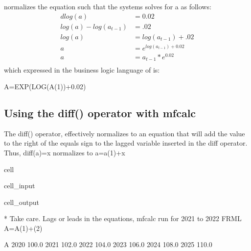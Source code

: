 \documentclass[letterpaper,10pt,english]{jupyterBook}
\begin{document}
\sphinxAtStartPar
{} normalizes the equation such that the systems solves for a as follows:
\begin{align*}
dlog(a) &= 0.02\\
log(a)-log(a_{t-1}) &= .02\\
log(a) &=log(a_{t-1})+.02\\
a &= e^{log(a_{t-1})+0.02}\\
a &=a_{t-1}*e^{0.02}\\
\end{align*}
\sphinxAtStartPar
which expressed in the business logic language of  is:

\sphinxAtStartPar
A=EXP(LOG(A(\sphinxhyphen{}1))+0.02)


\subsection{Using the diff() operator with mfcalc}
\label{\detokenize{content/04_PythonEssentials/mfcalc:using-the-diff-operator-with-mfcalc}}
\sphinxAtStartPar
The diff() operator, effectively normalizes to an equation that will add the value to the right of the equals sign to the lagged variable inserted in the diff operator.  Thus,  diff(a)=x normalizes to a=a(\sphinxhyphen{}1)+x

\begin{sphinxuseclass}{cell}\begin{sphinxVerbatimInput}

\begin{sphinxuseclass}{cell_input}
\begin{sphinxVerbatim}[commandchars=\\\{\}]
\end{sphinxVerbatim}

\end{sphinxuseclass}\end{sphinxVerbatimInput}
\begin{sphinxVerbatimOutput}

\begin{sphinxuseclass}{cell_output}
\begin{sphinxVerbatim}[commandchars=\\\{\}]
* Take care. Lags or leads in the equations, mfcalc run for 2021 to 2022
FRML \PYGZlt{}\PYGZgt{} A=A(\PYGZhy{}1)+(2)\PYGZdl{}
\end{sphinxVerbatim}

\begin{sphinxVerbatim}[commandchars=\\\{\}]
          A
2020  100.0
2021  102.0
2022  104.0
2023  106.0
2024  108.0
2025  110.0
\end{sphinxVerbatim}

\end{sphinxuseclass}\end{sphinxVerbatimOutput}

\end{sphinxuseclass}
\end{document}
